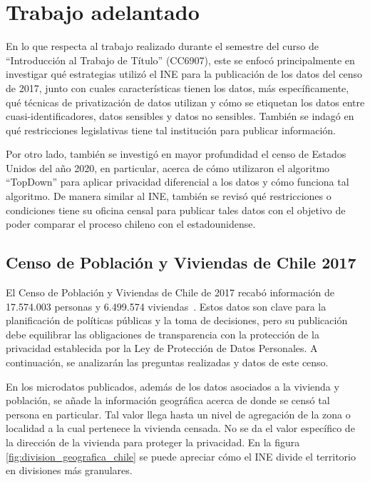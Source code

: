 \documentclass[informe]{upropuesta}
\begin{document}
\section{Trabajo adelantado}

En lo que respecta al trabajo realizado durante el semestre del curso de “Introducción al Trabajo de Título” (CC6907), este se enfocó principalmente en investigar qué estrategias utilizó el INE para la publicación de los datos del censo de 2017, junto con cuales características tienen los datos, más específicamente, qué técnicas de privatización de datos utilizan y cómo se etiquetan los datos entre cuasi-identificadores, datos sensibles y datos no sensibles. También se indagó en qué restricciones legislativas tiene tal institución para publicar información.

Por otro lado, también se investigó en mayor profundidad el censo de Estados Unidos del año 2020, en particular, acerca de cómo utilizaron el algoritmo “TopDown” para aplicar privacidad diferencial a los datos y cómo funciona tal algoritmo. De manera similar al INE, también se revisó qué restricciones o condiciones tiene su oficina censal para publicar tales datos con el objetivo de poder comparar el proceso chileno con el estadounidense.

\subsection{Censo de Población y Viviendas de Chile 2017}

El Censo de Población y Viviendas de Chile de 2017 recabó información de 17.574.003 personas y 6.499.574 viviendas~\cite{DatosCenso2017}. Estos datos son clave para la planificación de políticas públicas y la toma de decisiones, pero su publicación debe equilibrar las obligaciones de transparencia con la protección de la privacidad establecida por la Ley de Protección de Datos Personales. A continuación, se analizarán las preguntas realizadas y datos de este censo.

En los microdatos publicados, además de los datos asociados a la vivienda y población, se añade la información geográfica acerca de donde se censó tal persona en particular. Tal valor llega hasta un nivel de agregación de la zona o localidad a la cual pertenece la vivienda censada. No se da el valor específico de la dirección de la vivienda para proteger la privacidad. En la figura \ref{fig:division_geografica_chile} se puede apreciar cómo el INE divide el territorio en divisiones más granulares.
\end{document}
